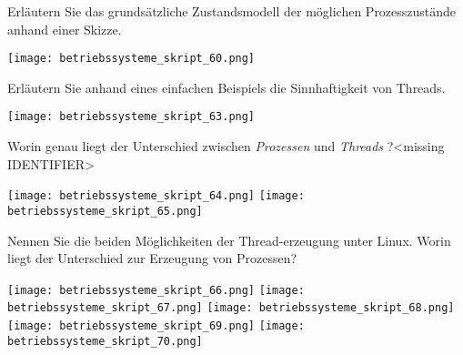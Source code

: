 \documentclass{article}
\begin{document}
\begin{tcolorbox}[colback=white!10!white,colframe=lightgray!75!black,
  savelowerto=\jobname_ex.tex]

\begin{center}
Erläutern Sie das grundsätzliche Zustandsmodell der möglichen Prozesszustände anhand einer Skizze.

\end{center}

\tcblower

\justifying
\texttt{[image: betriebssysteme\_skript\_60.png]}

\end{tcolorbox}
\begin{tcolorbox}[colback=white!10!white,colframe=lightgray!75!black,
  savelowerto=\jobname_ex.tex]

\begin{center}
Erläutern Sie anhand eines einfachen Beispiels die Sinnhaftigkeit von Threads.

\end{center}

\tcblower

\justifying
\texttt{[image: betriebssysteme\_skript\_63.png]}

\end{tcolorbox}
\begin{tcolorbox}[colback=white!10!white,colframe=lightgray!75!black,
  savelowerto=\jobname_ex.tex]

\begin{center}
Worin genau liegt der Unterschied zwischen 
\textit{Prozessen
} und 
\textit{Threads
}?<missing IDENTIFIER>

\end{center}

\tcblower

\justifying
\texttt{[image: betriebssysteme\_skript\_64.png]}
\texttt{[image: betriebssysteme\_skript\_65.png]}

\end{tcolorbox}
\begin{tcolorbox}[colback=white!10!white,colframe=lightgray!75!black,
  savelowerto=\jobname_ex.tex]

\begin{center}
Nennen Sie die beiden Möglichkeiten der Thread-erzeugung unter Linux. 
Worin liegt der Unterschied zur Erzeugung von Prozessen?

\end{center}

\tcblower

\justifying
\texttt{[image: betriebssysteme\_skript\_66.png]}
\texttt{[image: betriebssysteme\_skript\_67.png]}
\texttt{[image: betriebssysteme\_skript\_68.png]}
\texttt{[image: betriebssysteme\_skript\_69.png]}
\texttt{[image: betriebssysteme\_skript\_70.png]}

\end{tcolorbox}
\end{document}
